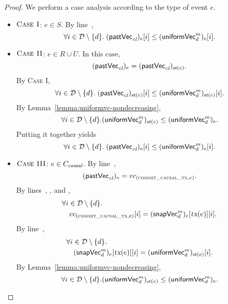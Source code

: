 \begin{proof} \label{proof:pastvc-uniformvc-except-d}
  We perform a case analysis according to the type of event $e$.
  \begin{itemize}
    \item $\textsc{Case I}$: $e \in S$.
      By line~\code{\ref{alg:unistore-coord}}{\ref{line:start-uniformvc}},
      \[
        \forall i \in \mathcal{D} \setminus \{d\}.\;
          ({\sf pastVec}_{\mathit{cl}})_{e}[i] \le ({\sf uniformVec}^{m}_{d})_{e}[i].
      \]
    \item $\textsc{Case II}$: $e \in R \cup U$.
      In this case,
      \[
        ({\sf pastVec}_{\mathit{cl}})_{e} = ({\sf pastVec}_{\mathit{cl}})_{\textsl{st}(e)}.
      \]
      By \textsc{Case I},
      \[
        \forall i \in \mathcal{D} \setminus \{d\}.\;
          ({\sf pastVec}_{\mathit{cl}})_{\textsl{st}(e)}[i] \le ({\sf uniformVec}^{m}_{d})_{\textsl{st}(e)}[i].
      \]
      By Lemma~\ref{lemma:uniformvc-nondecreasing},
      \[
        \forall i \in \mathcal{D} \setminus \{d\}. \\
          ({\sf uniformVec}^{m}_{d})_{\textsl{st}(e)} \le ({\sf uniformVec}^{m}_{d})_{e}.
      \]
      Putting it together yields
      \[
        \forall i \in \mathcal{D} \setminus \{d\}.\;
          ({\sf pastVec}_{\mathit{cl}})_{e}[i] \le ({\sf uniformVec}^{m}_{d})_{e}[i].
      \]
    \item $\textsc{Case III}$: $e \in C_{\textsl{causal}}$.
      By line~\code{\ref{alg:unistore-client}}{\ref{line:commitcausaltx-pastvc}},
      \[
        ({\sf pastVec}_{\mathit{cl}})_{e} = vc_{(\textsc{commit\_causal\_tx}, e)}.
      \]
      By lines~\code{\ref{alg:unistore-coord}}{\ref{line:commitcausal-return-ro}},
      \code{\ref{alg:unistore-coord}}{\ref{line:commitcausal-commitvc}},
      and \code{\ref{alg:unistore-coord}}{\ref{line:commitcausal-return}},
      \begin{align*}
        &\forall i \in \mathcal{D} \setminus \{d\}. \\
          &\quad vc_{(\textsc{commit\_causal\_tx}, e)}[i] = ({\sf snapVec}^{m}_{d})_{e}[\textsl{tx}(e)][i].
      \end{align*}
      By line~\code{\ref{alg:unistore-coord}}{\ref{line:start-snapvc}},
      \begin{align*}
        &\forall i \in \mathcal{D} \setminus \{d\}. \\
          &\quad ({\sf snapVec}^{m}_{d})_{e}[\textsl{tx}(e)][i] = ({\sf uniformVec}^{m}_{d})_{\textsl{st}(e)}[i].
      \end{align*}
      By Lemma~\ref{lemma:uniformvc-nondecreasing},
      \[
        \forall i \in \mathcal{D} \setminus \{d\}. \\
          ({\sf uniformVec}^{m}_{d})_{\textsl{st}(e)} \le ({\sf uniformVec}^{m}_{d})_{e}.
\]
\end{itemize}
\end{proof}
